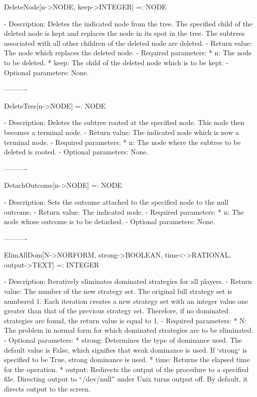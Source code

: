 DeleteNode[n->NODE, keep->INTEGER] =: NODE

   -	Description:  Deletes the indicated node from the tree.  The specified
	child of the deleted node is kept and replaces the node in its spot in
	the tree.  The subtrees associated with all other children of the 
	deleted node are deleted.
   -	Return value:  The node which replaces the deleted node.
   -	Required parameters:
	  *  n:  The node to be deleted.
	  *  keep:  The child of the deleted node which is to be kept.
   -	Optional parameters:  None.

----------

DeleteTree[n->NODE] =: NODE

   -	Description:  Deletes the subtree rooted at the specified node.  This 
	node then becomes a terminal node.
   -	Return value:  The indicated node which is now a terminal node.
   -	Required parameters:
	  *  n:  The node where the subtree to be deleted is rooted.
   -	Optional parameters:  None.

----------

DetachOutcome[n->NODE] =: NODE

   -	Description:  Sets the outcome attached to the specified node to the 
	null outcome.
   -	Return value:  The indicated node.
   -	Required parameters:
	  *  n:  The node whose outcome is to be detached.
   -	Optional parameters:  None.

----------

ElimAllDom[N->NORFORM, {strong->BOOLEAN}, {time<->RATIONAL}, {output->TEXT}] 
	=: INTEGER

   -	Description:  Iteratively eliminates dominated strategies for all 
	players.
   -	Return value:  The number of the new strategy set.  The original full
	strategy set is numbered 1.  Each iteration creates a new strategy set
	with an integer value one greater than that of the previous strategy 
	set.  Therefore, if no dominated strategies are found, the return value
	is equal to 1.
   -	Required parameters:
	  *  N:  The problem in normal form for which dominated strategies are
	     to be eliminated.
   -	Optional parameters:
	  *  strong:  Determines the type of dominance used.  The default value
	     is False, which signifies that weak dominance is used.  If 
	     `strong` is specified to be True, strong dominance is used.  
	  *  time:  Returns the elapsed time for the operation.
	  *  output:  Redirects the output of the procedure to a specified 
	     file.  Directing output to ``/dev/null'' under Unix turns output
	     off.  By default, it directs output to the screen.

